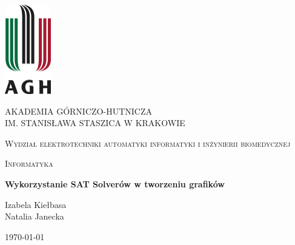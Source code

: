 \documentclass{article}
\begin{document}
\begin{titlepage}
	\centering
	\includegraphics[width=0.15\textwidth]{agh}\par\vspace{1cm}	
	{\scshape\large AKADEMIA GÓRNICZO-HUTNICZA \\IM. STANISŁAWA STASZICA W KRAKOWIE \par}
	\vspace{0.5cm}
	{\scshape\large Wydział elektrotechniki automatyki	informatyki i inżynierii biomedycznej \par}
	\vspace{0.5cm}
	{\scshape\Large Informatyka \par}
	\vspace{1cm}
	{\huge\bfseries Wykorzystanie SAT Solverów w tworzeniu grafików\par}
	\vspace{2cm}
	{\large Izabela Kiełbasa \\ Natalia Janecka\par}
	\vfill
	\vfill
	{\large \today\par}
\end{titlepage}
\clearpage
\end{document}
